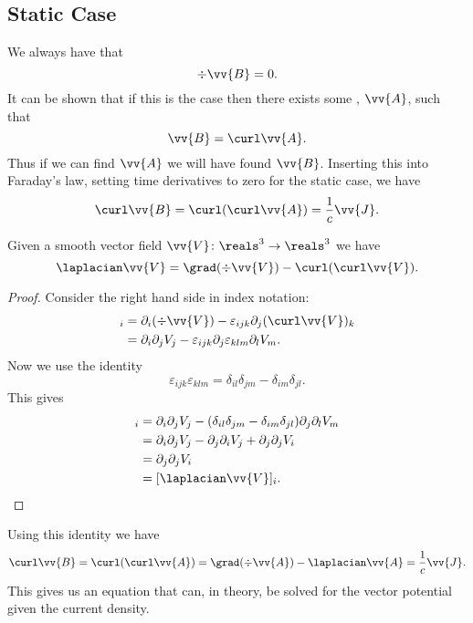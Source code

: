 \subsection{Static Case}
We always have that
\begin{equation}
    \div\vv{B} = 0.
\end{equation}
It can be shown that if this is the case then there exists some , \(\vv{A}\), such that
\begin{equation}
    \vv{B} = \curl\vv{A}.
\end{equation}
Thus if we can find \(\vv{A}\) we will have found \(\vv{B}\).
Inserting this into Faraday's law, setting time derivatives to zero for the static case, we have
\begin{equation}
    \curl\vv{B} = \curl(\curl\vv{A}) = \frac{1}{c}\vv{J}.
\end{equation}
\begin{lma}{}{}
    Given a smooth vector field \(\vv{V} \colon \reals^3 \to \reals^3\) we have
    \begin{equation}
        \laplacian\vv{V} = \grad(\div\vv{V}) - \curl(\curl\vv{V}).
    \end{equation}
    \begin{proof}
        Consider the right hand side in index notation:
        \begin{align}
            [\grad(\div\vv{V}) - \curl(\curl\vv{V})]_i &= \partial_i(\div\vv{V}) - \varepsilon_{ijk}\partial_j(\curl\vv{V})_k\\
            &= \partial_i\partial_jV_j - \varepsilon_{ijk}\partial_j\varepsilon_{klm}\partial_lV_m.
        \end{align}
        Now we use the identity
        \begin{equation}
            \varepsilon_{ijk}\varepsilon_{klm} = \delta_{il}\delta_{jm} - \delta_{im}\delta_{jl}.
        \end{equation}
        This gives
        \begin{align}
            [\grad(\div\vv{V}) - \curl(\curl\vv{V})]_i &= \partial_i\partial_jV_j - (\delta_{il}\delta_{jm} - \delta_{im}\delta_{jl})\partial_j\partial_lV_m\\
            &= \partial_i\partial_jV_j - \partial_j\partial_iV_j + \partial_j\partial_j V_i\\
            &= \partial_j\partial_j V_i\\
            &= [\laplacian \vv{V}]_i.\qedhere
        \end{align}
    \end{proof}
\end{lma}
Using this identity we have
\begin{equation}
    \curl\vv{B} = \curl(\curl\vv{A}) = \grad(\div\vv{A}) - \laplacian\vv{A} = \frac{1}{c}\vv{J}.
\end{equation}
This gives us an equation that can, in theory, be solved for the vector potential given the current density.


